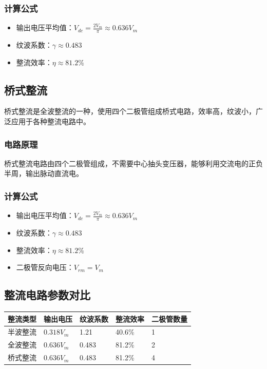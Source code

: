 \documentclass[12pt,UTF8]{ctexbook}
\begin{document}
\subsubsection{计算公式}

\begin{itemize}
    \item 输出电压平均值：$V_{dc} = \frac{2V_{m}}{\pi} \approx 0.636 V_{m}$
    \item 纹波系数：$\gamma \approx 0.483$
    \item 整流效率：$\eta \approx 81.2\%$
\end{itemize}

\subsection{桥式整流}

桥式整流是全波整流的一种，使用四个二极管组成桥式电路，效率高，纹波小，广泛应用于各种整流电路中。

\subsubsection{电路原理}

桥式整流电路由四个二极管组成，不需要中心抽头变压器，能够利用交流电的正负半周，输出脉动直流电。

\subsubsection{计算公式}

\begin{itemize}
    \item 输出电压平均值：$V_{dc} = \frac{2V_{m}}{\pi} \approx 0.636 V_{m}$
    \item 纹波系数：$\gamma \approx 0.483$
    \item 整流效率：$\eta \approx 81.2\%$
\end{itemize}
\begin{itemize}
    \item 二极管反向电压：$V_{rm} = V_{m}$
\end{itemize}

\subsection{整流电路参数对比}

\begin{tabular}{|l|l|l|l|l|}
\hline
整流类型 & 输出电压 & 纹波系数 & 整流效率 & 二极管数量 \\
\hline
半波整流 & $0.318 V_{m}$ & 1.21 & 40.6\% & 1 \\
\hline
全波整流 & $0.636 V_{m}$ & 0.483 & 81.2\% & 2 \\
\hline
桥式整流 & $0.636 V_{m}$ & 0.483 & 81.2\% & 4 \\
\hline
\end{tabular}
\end{document}
